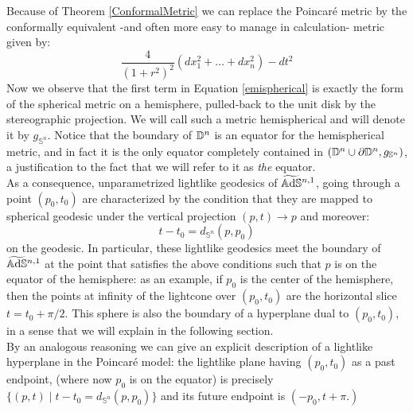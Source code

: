 Because of Theorem \ref{ConformalMetric} we can replace the Poincaré metric by the conformally equivalent -and often more easy to manage in calculation- metric given by:
 \begin{equation}\label{emispherical}
     \frac{4}{(1+r^2)^2}(dx_1^2+\dots+dx_n^2)-dt^2
 \end{equation} 
 Now we observe that the first term in Equation \ref{emispherical} is exactly the form of the spherical metric on a hemisphere, pulled-back to the unit disk by the stereographic projection. We will call such a metric hemispherical and will denote it by $g_{\mathbb{S}^n}$. Notice that the boundary of $\mathbb{D}^n$ is an equator for the hemispherical metric, and in fact it is the only equator completely contained in $(\mathbb{D}^n\cup\partial\mathbb{D}^n,g_{\mathbb{S}^n})$, a justification to the fact that we will refer to it as \textit{the} equator.\\
 As a consequence, unparametrized lightlike geodesics of $\widetilde{\mathbb{A}\mathrm{d}\mathbb{S}}{}^{n,1}$, going through a point $(p_0,t_0)$ are characterized by the condition that they are mapped to spherical geodesic under the vertical projection $(p,t)\to p$ and moreover: 
 \[
     t-t_0=d_{\mathbb{S}^n}(p,p_0)
 \] on the geodesic. In particular, these lightlike geodesics meet the boundary of $\widetilde{\mathbb{A}\mathrm{d}\mathbb{S}}{}^{n,1}$ at the point that satisfies the above conditions such that $p$ is on the equator of the hemisphere: as an example, if $p_0$ is the center of the hemisphere, then the points at infinity of the lightcone over $(p_0,t_0)$ are the horizontal slice $t=t_{0}+\pi/2.$ This sphere is also the boundary of a hyperplane dual to $(p_0,t_0)$, in a sense that we will explain in the following section. \\
 By an analogous reasoning we can give an explicit description of a lightlike hyperplane in the Poincaré model: the lightlike plane having $(p_0,t_0)$ as a past endpoint, (where now $p_0$ is on the equator) is precisely $\{(p,t)\;|\;t-t_0=d_{\mathbb{S}^n}(p,p_0)\}$ and its future endpoint is $(-p_0,t+\pi.)$ 


